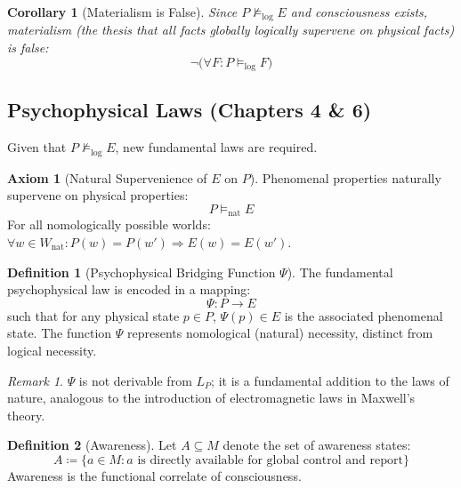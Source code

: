 \documentclass[11pt,a4paper]{article}
\theoremstyle{definition}
\newtheorem{definition}{Definition}[section]
\newtheorem{axiom}{Axiom}[section]
\theoremstyle{plain}
\newtheorem{corollary}{Corollary}[section]
\theoremstyle{remark}
\newtheorem{remark}{Remark}[section]
\newcommand{\logent}{\vDash_{\text{log}}}
\newcommand{\notlogent}{\nvDash_{\text{log}}}
\newcommand{\natent}{\vDash_{\text{nat}}}
\newcommand{\Wnat}{W_{\text{nat}}}
\begin{document}
\begin{corollary}[Materialism is False]
Since $P \notlogent E$ and consciousness exists, materialism (the thesis that all facts globally logically supervene on physical facts) is false:
\begin{equation}
\neg \big( \forall F: P \logent F \big)
\end{equation}
\end{corollary}

\subsection{Psychophysical Laws (Chapters 4 \& 6)}

Given that $P \notlogent E$, new fundamental laws are required.

\begin{axiom}[Natural Supervenience of $E$ on $P$]\label{ax:natural_supervenience}
Phenomenal properties naturally supervene on physical properties:
\begin{equation}
P \natent E
\end{equation}
For all nomologically possible worlds: $\forall w \in \Wnat: P(w) = P(w') \Rightarrow E(w) = E(w')$.
\end{axiom}

\begin{definition}[Psychophysical Bridging Function $\Psi$]
The fundamental psychophysical law is encoded in a mapping:
\begin{equation}
\boxed{\Psi: P \to E}
\end{equation}
such that for any physical state $p \in P$, $\Psi(p) \in E$ is the associated phenomenal state. The function $\Psi$ represents nomological (natural) necessity, distinct from logical necessity.
\end{definition}

\begin{remark}
$\Psi$ is not derivable from $L_P$; it is a fundamental addition to the laws of nature, analogous to the introduction of electromagnetic laws in Maxwell's theory.
\end{remark}

\begin{definition}[Awareness]
Let $A \subseteq M$ denote the set of awareness states:
\begin{equation}
A \coloneqq \{ a \in M : a \text{ is directly available for global control and report} \}
\end{equation}
Awareness is the functional correlate of consciousness.
\end{definition}
\end{document}
